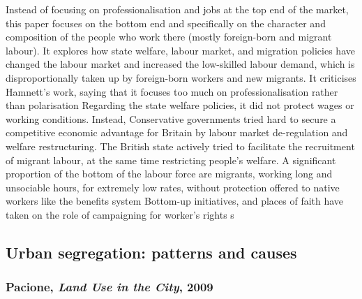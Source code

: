 \documentclass{article}
\begin{document}
\begin{outline}
	\1 Instead of focusing on professionalisation and jobs at the top end of the market, this paper focuses on the bottom end and specifically on the character and composition of the people who work there (mostly  foreign-born and migrant labour). 
	It explores how state welfare, labour market, and migration policies have changed the labour market and increased the low-skilled labour demand, which is disproportionally taken up by foreign-born workers and new migrants.
	\1 It criticises Hamnett's work, saying that it focuses too much on professionalisation rather than polarisation
	\1 Regarding the state welfare policies, it did not protect wages or working conditions. Instead, Conservative governments tried hard to secure a competitive economic advantage for Britain by labour market de-regulation and welfare restructuring. The British state actively tried to facilitate the recruitment of migrant labour, at the same time restricting people's welfare.
		\2 A significant proportion of the bottom of the labour force are migrants, working long and unsociable hours, for extremely low rates, without protection offered to native workers like the benefits system
	\1 Bottom-up initiatives, and places of faith have taken on the role of campaigning for worker's rights s
\end{outline}


\subsection{Urban segregation: patterns and causes}

\subsubsection{Pacione, \textit{Land Use in the City}, 2009}
\end{document}
